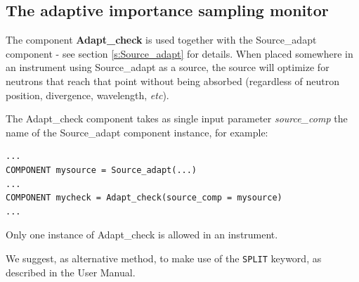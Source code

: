 \subsection*{The adaptive importance sampling monitor}
\label{s:adapt_check}


The component \textbf{Adapt\_check} is used together with the Source\_adapt component - see section \ref{s:Source_adapt} for details. When placed somewhere in an instrument using Source\_adapt as a source, the source will optimize for neutrons that reach that point without being absorbed (regardless of neutron position, divergence, wavelength, \emph{etc}).

The Adapt\_check component takes as single input parameter \emph{source\_comp} the name of the Source\_adapt component instance, for example:

\begin{lstlisting}
...
COMPONENT mysource = Source_adapt(...)
...
COMPONENT mycheck = Adapt_check(source_comp = mysource)
...
\end{lstlisting}

Only one instance of Adapt\_check is allowed in an instrument.

We suggest, as alternative method, to make use of the \texttt{SPLIT} keyword, as described in the \MCS User Manual.
